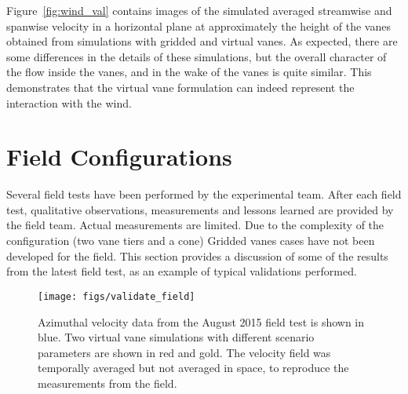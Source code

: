 
Figure~\ref{fig:wind_val} contains images of the simulated averaged
streamwise and  spanwise velocity in a horizontal plane at approximately
the height of the vanes obtained from simulations with gridded and
virtual vanes. As expected, there are some differences in the
details of these simulations, but the overall character of the flow
inside the vanes, and in the wake of the vanes is quite similar. This
demonstrates that the virtual vane formulation can indeed represent the
interaction with the wind. 

\section{Field Configurations}

Several field tests have been performed by the experimental team. After
each field test, qualitative observations, measurements and lessons
learned are provided by the field team. Actual measurements
are limited. Due to the complexity of the configuration
(two vane tiers and a cone) Gridded vanes cases have not been developed
for the field. This section provides a discussion of some of
the results from the latest field test, as an example of typical
validations performed. 

 \begin{figure}[!htb]
  \begin{center}
   \texttt{[image: figs/validate\_field]}
   \caption{Azimuthal velocity data from the August 2015 field test is
   shown in blue. Two virtual vane simulations with different scenario
   parameters are shown in red and gold. The velocity field was
   temporally averaged but not averaged in space, to reproduce
   the measurements from the field.}
   \label{fig:field_val}
  \end{center}
 \end{figure}
%
%

